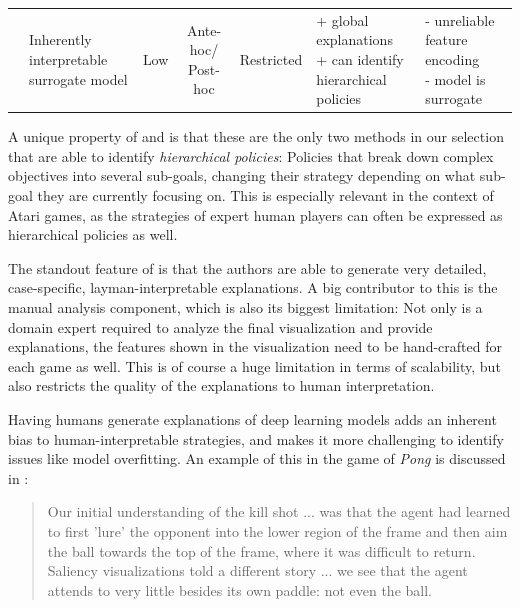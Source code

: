 \documentclass[sigconf]{acmart}
\begin{document}
\begin{table}[t!]
\begin{tabular}{clcccll}
\cite{Sieusahai2021} & \makecell[l]{Inherently interpretable\\surrogate model} & Low & \makecell{Ante-hoc/\\Post-hoc\footnotemark[2]} & Restricted & \makecell[l]{+ global explanations\\+ can identify\\hierarchical policies} & \makecell[l]{- unreliable feature\\encoding\\- model is surrogate}

\end{tabular}
\label{tab:comparison}
\end{table}

A unique property of \cite{Zahavy2016} and \cite{Sieusahai2021} is that these are the only two methods in our selection that are able to identify \textit{hierarchical policies}: Policies that break down complex objectives into several sub-goals, changing their strategy depending on what sub-goal they are currently focusing on.
This is especially relevant in the context of Atari games, as the strategies of expert human players can often be expressed as hierarchical policies as well\cite{huang2019playingatariballgames}.

The standout feature of \cite{Zahavy2016} is that the authors are able to generate very detailed, case-specific, layman-interpretable explanations.
A big contributor to this is the manual analysis component, which is also its biggest limitation: Not only is a domain expert required to analyze the final visualization and provide explanations, the features shown in the visualization need to be hand-crafted for each game as well.
This is of course a huge limitation in terms of scalability, but also restricts the quality of the explanations to human interpretation.

Having humans generate explanations of deep learning models adds an inherent bias to human-interpretable strategies, and makes it more challenging to identify issues like model overfitting.
An example of this in the game of \textit{Pong} is discussed in \cite{Greydanus2018}:

\begin{quote}
    Our initial understanding of the kill shot ... was that the agent had learned to first 'lure' the opponent into the lower region of the frame and then aim the ball towards the top of the frame, where it was difficult to return.
    Saliency visualizations told a different story ... we see that the agent attends to very little besides its own paddle: not even the ball.
\end{quote}
\end{document}
